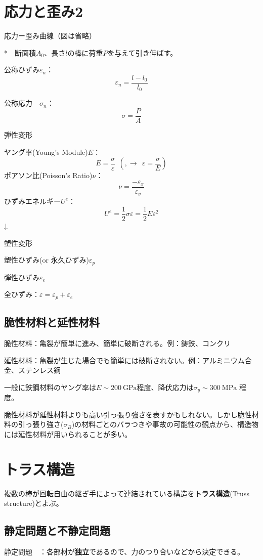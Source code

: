 \documentclass[a4j,10pt,oneside,openany]{jsbook}
\begin{document}
\section{応力と歪み2}

応力ー歪み曲線（図は省略）

*　断面積$A_0$、長さ$l$の棒に荷重$P$を与えて引き伸ばす。

公称ひずみ$\varepsilon_n$：
\[\varepsilon_n = \frac{l-l_0}{l_0}\]

公称応力　$\sigma_n$：
\[\sigma = \frac{P}{A}\]

弾性変形 

ヤング率(Young's Module)$E$：
\[E = \frac{\sigma}{\varepsilon}\ \ \left(, \rightarrow\ \  \varepsilon = \frac{\sigma}{E} \right)\]
ポアソン比(Poisson's Ratio)$\nu$：
\[\nu = \frac{-\varepsilon_x}{\varepsilon_y}\]
ひずみエネルギー$U^e$：
\[U^e = \frac{1}{2} \sigma \varepsilon = \frac{1}{2} E \varepsilon^2\]
↓

塑性変形

塑性ひずみ(or 永久ひずみ)$\varepsilon_p$

弾性ひずみ$\varepsilon_e$

全ひずみ：$\varepsilon = \varepsilon_p + \varepsilon_e$

\subsection{脆性材料と延性材料}
脆性材料：亀裂が簡単に進み、簡単に破断される。例：鋳鉄、コンクリ

延性材料：亀裂が生じた場合でも簡単には破断されない。例：アルミニウム合金、ステンレス鋼

一般に鉄鋼材料のヤング率は$E\sim200\ \mathrm{GPa}$程度、降伏応力は$\sigma_y \sim 300\ \mathrm{MPa}$ 程度。

脆性材料が延性材料よりも高い引っ張り強さを表すかもしれない。しかし脆性材料の引っ張り強さ($\sigma_B$)の材料ごとのバラつきや事故の可能性の観点から、構造物には延性材料が用いられることが多い。

\section{トラス構造}
複数の棒が回転自由の継ぎ手によって連結されている構造を\textbf{トラス構造}(Truss structure)とよぶ。

\subsection{静定問題と不静定問題}
静定問題　：各部材が\textbf{独立}であるので、力のつり合いなどから決定できる。
\end{document}
